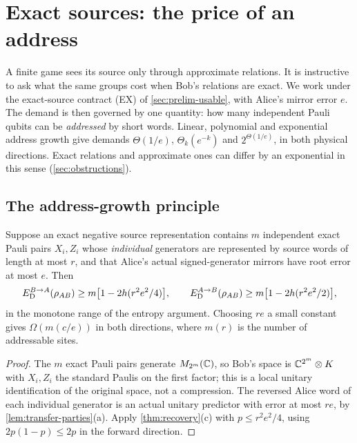 \section{Exact sources: the price of an address}\label{sec:exact}

A finite game sees its source only through approximate relations. It is instructive to ask what the same groups cost when
Bob's relations are exact. We work under the exact-source contract (EX) of \cref{sec:prelim-usable}, with Alice's mirror error $e$.
The demand is then governed by one quantity: how many independent Pauli qubits can be \emph{addressed} by short words. Linear, polynomial and
exponential address growth give demands $\Theta(1/e)$, $\Theta_k(e^{-k})$ and $2^{\Theta(1/e)}$, in both physical directions.
Exact relations and approximate ones can differ by an exponential in this sense (\cref{sec:obstructions}).

\subsection{The address-growth principle}\label{sec:address}

\begin{theorem}\label{thm:address}
Suppose an exact negative source representation contains $m$ independent exact Pauli pairs $X_i,Z_i$ whose \emph{individual}
generators are represented by source words of length at most $r$, and that Alice's actual signed-generator mirrors have root
error at most $e$. Then
\[
E_{\mathrm D}^{B\to A}(\rho_{AB})\ge m\bigl[1-2h(r^2e^2/4)\bigr],\qquad E_{\mathrm D}^{A\to B}(\rho_{AB})\ge m\bigl[1-2h(r^2e^2/2)\bigr],
\]
in the monotone range of the entropy argument. Choosing $re$ a small constant gives $\Omega(m(c/e))$ in both directions, where
$m(r)$ is the number of addressable sites.
\end{theorem}

\begin{proof}
The $m$ exact Pauli pairs generate $M_{2^m}(\mathbb C)$, so Bob's space is $\mathbb C^{2^m}\otimes K$ with $X_i,Z_i$ the standard Paulis on the first
factor; this is a local unitary identification of the original space, not a compression. The reversed Alice word of each
individual generator is an actual unitary predictor with error at most $re$, by \cref{lem:transfer-parties}(a). Apply
\cref{thm:recovery}(c) with $p\le r^2e^2/4$, using $2p(1-p)\le2p$ in the forward direction.
\end{proof}

